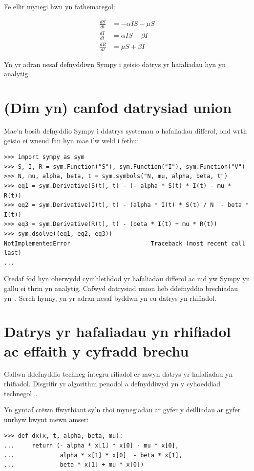 \documentclass[a4paper]{article}
\begin{document}
Fe ellir mynegi hwn yn fathemategol:

\begin{align}
    \frac{dS}{dt} &= - \alpha I S - \mu S\\
    \frac{dI}{dt} &=  \alpha I S - \beta I\\
    \frac{dR}{dt} &=  \mu S + \beta I
\end{align}

Yn yr adran nesaf defnyddiwn Sympy i geisio datrys yr hafaliadau hyn yn
analytig.


\section{(Dim yn) canfod datrysiad union}

Mae'n bosib defnyddio Sympy i ddatrys systemau o hafaliadau differol, ond wrth
geisio ei wneud fan hyn mae i'w weld i fethu:

\begin{verbatim}
>>> import sympy as sym
>>> S, I, R = sym.Function("S"), sym.Function("I"), sym.Function("V")
>>> N, mu, alpha, beta, t = sym.symbols("N, mu, alpha, beta, t")
>>> eq1 = sym.Derivative(S(t), t) - (- alpha * S(t) * I(t) - mu * R(t))
>>> eq2 = sym.Derivative(I(t), t) - (alpha * I(t) * S(t) / N  - beta * I(t))
>>> eq3 = sym.Derivative(R(t), t) - (beta * I(t) + mu * R(t))
>>> sym.dsolve((eq1, eq2, eq3))
NotImplementedError                       Traceback (most recent call last)
...
\end{verbatim}

Credaf fod hyn oherwydd cymhlethdod yr hafaliadau differol ac nid yw Sympy yn
gallu ei thrin yn analytig. Cafwyd datrysiad union heb ddefnyddio brechiadau
yn~\cite{harko2014exact}.
Serch hynny, yn yr adran nesaf byddwn yn eu datrys yn rhifiadol.


\section{Datrys yr hafaliadau yn rhifiadol ac effaith  y cyfradd brechu}

Gallwn ddefnyddio techneg integru rifiadol er mwyn datrys yr hafaliadau yn
rhifiadol. Disgrifir yr algorithm penodol a defnyddiwyd yn y cyhoeddiad
technegol~\cite{radhakrishnan1993description}.


Yn gyntaf cr\"{e}wn ffwythiant sy'n rhoi mynegiadau ar gyfer y deilliadau ar
gyfer unrhyw bwynt mewn amser:

\begin{verbatim}
>>> def dx(x, t, alpha, beta, mu):
...     return (- alpha * x[1] * x[0] - mu * x[0],
...             alpha * x[1] * x[0]  - beta * x[1],
...             beta * x[1] + mu * x[0])
\end{verbatim}
\end{document}

